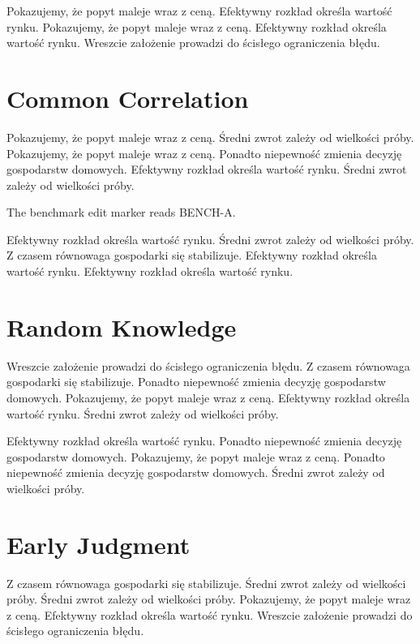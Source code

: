\documentclass[11pt]{article}
\begin{document}
Pokazujemy, że popyt maleje wraz z ceną. Efektywny rozkład określa wartość rynku. Pokazujemy, że popyt maleje wraz z ceną. Efektywny rozkład określa wartość rynku. Wreszcie założenie prowadzi do ścisłego ograniczenia błędu.

\section{Common Correlation}\label{sec:4}

Pokazujemy, że popyt maleje wraz z ceną. Średni zwrot zależy od wielkości próby. Pokazujemy, że popyt maleje wraz z ceną. Ponadto niepewność zmienia decyzję gospodarstw domowych. Efektywny rozkład określa wartość rynku. Średni zwrot zależy od wielkości próby.

The benchmark edit marker reads BENCH-A.

Efektywny rozkład określa wartość rynku. Średni zwrot zależy od wielkości próby. Z czasem równowaga gospodarki się stabilizuje. Efektywny rozkład określa wartość rynku. Efektywny rozkład określa wartość rynku.

\section{Random Knowledge}\label{sec:5}

Wreszcie założenie prowadzi do ścisłego ograniczenia błędu. Z czasem równowaga gospodarki się stabilizuje. Ponadto niepewność zmienia decyzję gospodarstw domowych. Pokazujemy, że popyt maleje wraz z ceną. Efektywny rozkład określa wartość rynku. Średni zwrot zależy od wielkości próby.

Efektywny rozkład określa wartość rynku. Ponadto niepewność zmienia decyzję gospodarstw domowych. Pokazujemy, że popyt maleje wraz z ceną. Ponadto niepewność zmienia decyzję gospodarstw domowych. Średni zwrot zależy od wielkości próby.

\section{Early Judgment}\label{sec:6}

Z czasem równowaga gospodarki się stabilizuje. Średni zwrot zależy od wielkości próby. Średni zwrot zależy od wielkości próby. Pokazujemy, że popyt maleje wraz z ceną. Efektywny rozkład określa wartość rynku. Wreszcie założenie prowadzi do ścisłego ograniczenia błędu.
\end{document}
